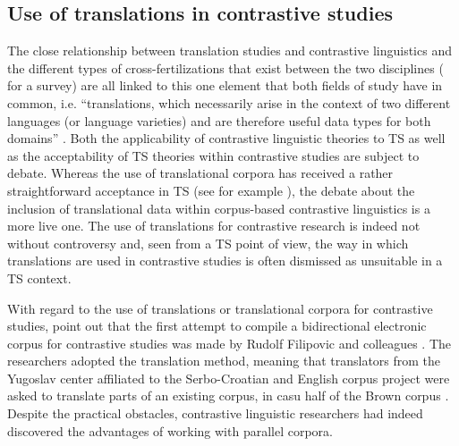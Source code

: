 \subsection{Use of translations in contrastive studies}
\label{sec:2.3.1}  
The close relationship between translation studies and contrastive linguistics and the different types of cross-fertilizations that exist between the two disciplines  (\citealt{gambier_contrastive_2013} for a survey) are all linked to this one element that both fields of study have in common, i.e. “translations, which necessarily arise in the context of two different languages (or language varieties) and are therefore useful data types for both domains” \citep[36]{gambier_contrastive_2013}. Both the applicability of contrastive linguistic theories to TS as well as the acceptability of TS theories within contrastive studies are subject to debate. Whereas the use of translational corpora has received a rather straightforward acceptance in TS (see for example \citealt{wollin_translationese_1986, aijmer_translations_1996,laviosa_corpus-based_2002}), the debate about the inclusion of translational data within corpus-based contrastive linguistics is a more live one. The use of translations for contrastive research is indeed not without controversy and, seen from a TS point of view, the way in which translations are used in contrastive studies is often dismissed as unsuitable in a TS context.

With regard to the use of translations or translational corpora for contrastive studies, \citet[40]{altenberg_recent_2002} point out that the first attempt to compile a bidirectional electronic corpus for contrastive studies was made by Rudolf Filipovic and colleagues \citep{filipovic_choice_1969}. The researchers adopted the translation method, meaning that translators from the Yugoslav center affiliated to the Serbo-Croatian and English corpus project were asked to translate parts of an existing corpus, in casu half of the Brown corpus \citep[38-43]{filipovic_choice_1969}. Despite the practical obstacles, contrastive linguistic researchers had indeed discovered the advantages of working with parallel corpora.

